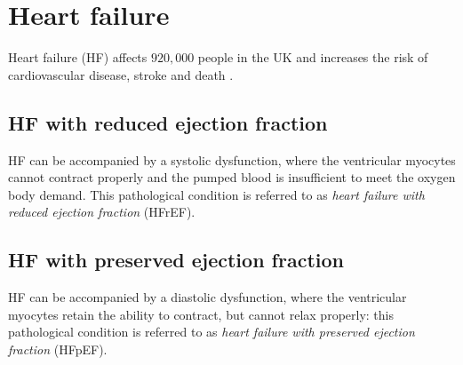 %
%
%
\section{Heart failure}
Heart failure (\acs{HF}) affects $920,000$ people in the UK \cite{Bhf:2021} and increases the risk of cardiovascular disease, stroke and death \cite{Adelborg:2017, Henkel:2008}.


%
%
%
\subsection{HF with reduced ejection fraction}
HF can be accompanied by a systolic dysfunction, where the ventricular myocytes cannot contract properly and the pumped blood is insufficient to meet the oxygen body demand. This pathological condition is referred to as \textit{heart failure with reduced ejection fraction} (\acs{HFrEF}).


%
%
%
\subsection{HF with preserved ejection fraction}
HF can be accompanied by a diastolic dysfunction, where the ventricular myocytes retain the ability to contract, but cannot relax properly: this pathological condition is referred to as \textit{heart failure with preserved ejection fraction} (\acs{HFpEF}).

